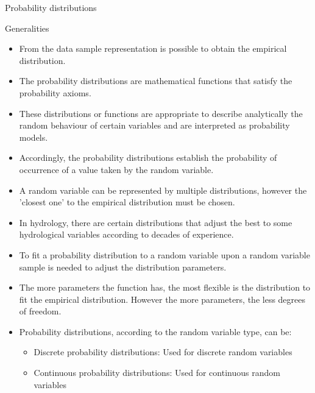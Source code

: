 \documentclass[8pt]{beamer}
\begin{document}
\begin{frame}{Probability distributions}
    \begin{block}{Generalities}
        \begin{itemize}
            \item From the data sample representation is possible to obtain the \alert{empirical distribution}. 
            \item The \alert{probability distributions} are mathematical functions that satisfy the probability axioms. 
            \item These distributions or functions are appropriate to describe analytically the random behaviour of certain variables and are interpreted as probability models. 
            \item Accordingly, the probability distributions establish the probability of occurrence of a value taken by the random variable. 
            \item A random variable can be represented by multiple distributions, however the 'closest one' to the empirical distribution  must be chosen. 
            \item In hydrology, there are certain distributions that adjust the best to some hydrological variables according to decades of experience. 
            \item To fit a probability distribution to a random variable upon a random variable sample is needed to adjust the distribution \alert{parameters}.
            \item The more parameters the function has, the most flexible is the distribution to fit the empirical distribution. However the more parameters, the less degrees of freedom.
            \item Probability distributions, according to the random variable type, can be:
                \begin{itemize}
                    \item Discrete probability distributions: Used for discrete random variables
                    \item Continuous probability distributions: Used for continuous random variables
                \end{itemize}
        \end{itemize}
    \end{block}

\end{frame}
\end{document}
